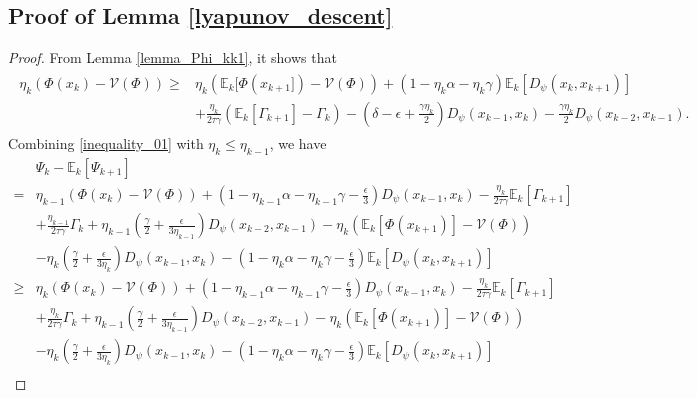 \documentclass[letterpaper]{article} %
\begin{document}
	\subsection{Proof of  Lemma \ref{lyapunov_descent}}
	\begin{proof}
		From Lemma \ref{lemma_Phi_kk1}, it shows that
		\begin{eqnarray}
			\begin{aligned}
				\eta_{k}(\Phi(x_{k})-\mathcal{V}(\Phi))
				\ge&\eta_{k}(\mathbb{E}_{k}[\Phi(x_{k+1}])-\mathcal{V}(\Phi)) +(1-\eta_{k}\alpha-\eta_{k}\gamma)\mathbb{E}_{k}[D_{\psi}(x_{k},x_{k+1})]\\
				&+\frac{\eta_{k}}{2\tau\gamma}(\mathbb{E}_{k}[\Gamma_{k+1}]-\Gamma_{k})
				-\left(\delta-\epsilon+\frac{\gamma\eta_{k}}{2}\right)D_{\psi}(x_{k-1},x_{k})
				-\frac{\gamma\eta_{k}}{2}D_{\psi}(x_{k-2},x_{k-1}). \label{inequality_01}
			\end{aligned}
		\end{eqnarray}
		Combining \eqref{inequality_01} with $\eta_{k}\le\eta_{k-1}$, we have
		\begin{align*}
			&\Psi_{k}-\mathbb{E}_{k}[\Psi_{k+1}]\\
			=&\eta_{k-1}(\Phi(x_{k}) -\mathcal{V}(\Phi))  +\left(1-\eta_{k-1}\alpha-\eta_{k-1}\gamma-\frac{\epsilon}{3}\right)D_{\psi}(x_{k-1},x_{k})-\frac{\eta_{k}}{2\tau\gamma}\mathbb{E}_{k}[\Gamma_{k+1}]\\
			&+\frac{\eta_{k-1}}{2\tau\gamma}\Gamma_{k}+\eta_{k-1}\left(\frac{\gamma}{2}+\frac{\epsilon}{3\eta_{k-1}}\right)D_{\psi}(x_{k-2},x_{k-1})
			-\eta_{k}(\mathbb{E}_{k}[\Phi(x_{k+1})] -\mathcal{V}(\Phi))\\
			&-\eta_{k}\left(\frac{\gamma}{2}+\frac{\epsilon}{3\eta_{k}}\right)D_{\psi}(x_{k-1},x_{k}) -(1-\eta_{k}\alpha-\eta_{k}\gamma-\frac{\epsilon}{3})\mathbb{E}_{k}[D_{\psi}(x_{k},x_{k+1})]\\
			\ge&\eta_{k}(\Phi(x_{k}) -\mathcal{V}(\Phi))  +\left(1-\eta_{k-1}\alpha-\eta_{k-1}\gamma-\frac{\epsilon}{3}\right)D_{\psi}(x_{k-1},x_{k})-\frac{\eta_{k}}{2\tau\gamma}\mathbb{E}_{k}[\Gamma_{k+1}]\\
			&+\frac{\eta_{k}}{2\tau\gamma}\Gamma_{k}+\eta_{k-1}\left(\frac{\gamma}{2}+\frac{\epsilon}{3\eta_{k-1}}\right)D_{\psi}(x_{k-2},x_{k-1})
			-\eta_{k}(\mathbb{E}_{k}[\Phi(x_{k+1})] -\mathcal{V}(\Phi))\\
			&-\eta_{k}\left(\frac{\gamma}{2}+\frac{\epsilon}{3\eta_{k}}\right)D_{\psi}(x_{k-1},x_{k}) -\left(1-\eta_{k}\alpha-\eta_{k}\gamma-\frac{\epsilon}{3}\right)\mathbb{E}_{k}[D_{\psi}(x_{k},x_{k+1})]\\

\end{align*}
\end{proof}
\end{document}
